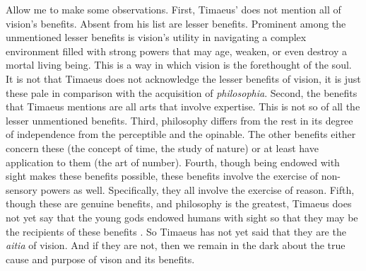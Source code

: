 Allow me to make some observations. First, Timaeus' does not mention all of vision's benefits. Absent from his list are lesser benefits. Prominent among the unmentioned lesser benefits is vision's utility in navigating a complex environment filled with strong powers that may age, weaken, or even destroy a mortal living being. This is a way in which vision is the forethought of the soul. It is not that Timaeus does not acknowledge the lesser benefits of vision, it is just these pale in comparison with the acquisition of \emph{philosophia}. Second, the benefits that Timaeus mentions are all arts that involve expertise. This is not so of all the lesser unmentioned benefits. Third, philosophy differs from the rest in its degree of independence from the perceptible and the opinable. The other benefits either concern these (the concept of time, the study of nature) or at least have application to them (the art of number). Fourth, though being endowed with sight makes these benefits possible, these benefits involve the exercise of non-sensory powers as well. Specifically, they all involve the exercise of reason.  Fifth, though these are genuine benefits, and philosophy is the greatest, Timaeus does not yet say that the young gods endowed humans with sight so that they may be the recipients of these benefits \citep[107]{Johansen:2004dx}. So Timaeus has not yet said that they are the \emph{aitia} of vision. And if they are not, then we remain in the dark about the true cause and purpose of vison and its benefits.

